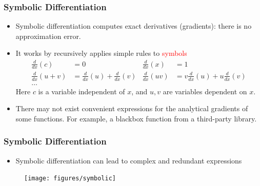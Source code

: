\documentclass{beamer}
\begin{document}
\begin{frame}
	\frametitle{Symbolic Differentiation }
		
	\begin{itemize}
		\item Symbolic differentiation computes exact derivatives (gradients): there is no approximation error. 
		\item It works by recursively applies simple rules to \textcolor{red}{symbols}
		\begin{align*}
			\frac{d}{dx}(c) &= 0  & \frac{d}{dx}(x) &= 1\\
			\frac{d}{dx}(u+v) &= \frac{d}{dx}(u) + \frac{d}{dx}(v) & \frac{d}{dx}(uv) &= v\frac{d}{dx}(u)+u\frac{d}{dx}(v)\\
			\ldots
		\end{align*}
		Here $c$ is a variable independent of $x$, and $u, v$ are variables dependent on $x$. 
	
		\item There may not exist convenient expressions for the analytical gradients of some functions. For example, a blackbox function from a third-party library. 
		
	\end{itemize}
\end{frame}

\begin{frame}
\frametitle{Symbolic Differentiation}
\begin{itemize}
\item Symbolic differentiation can lead to complex and redundant expressions
\end{itemize}
	\begin{figure}[hbt]
		\centering
  \texttt{[image: figures/symbolic]}
\end{figure}
\end{frame}
\end{document}
